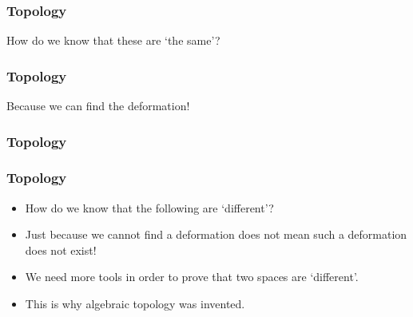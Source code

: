 \begin{frame}
\frametitle{Topology}
How do we know that these are `the same'?

\end{frame}

\begin{frame}
\frametitle{Topology}
Because we can find the deformation!
\frametitle{Topology}
\begin{center}
\end{center}
\end{frame}



\begin{frame}
\frametitle{Topology}
\begin{itemize}
\item<1-> How do we know that the following are `different'?
\end{itemize}
\begin{itemize}
\item<2-> Just because we cannot find a deformation does not mean such a deformation does not exist!
\item<3-> We need more tools in order to prove that two spaces are `different'.
\item<4-> This is why algebraic topology was invented.
\end{itemize}
\end{frame}